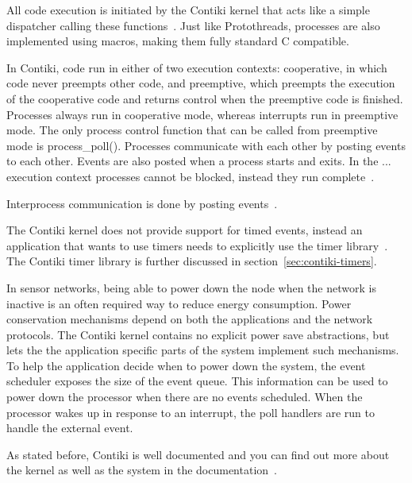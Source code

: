All code execution is initiated by the Contiki kernel
that acts like a simple dispatcher calling these functions~\cite{contiki-docs}.
Just like Protothreads, processes are also implemented using macros,
making them fully standard C compatible.

In Contiki, code run in either of two execution contexts:
cooperative, in which code never preempts other code, and preemptive,
which preempts the execution of the cooperative code and returns control
when the preemptive code is finished.
Processes always run in cooperative mode, whereas interrupts run in preemptive mode.
The only process control function that can be called from preemptive mode is process\_poll(). 
Processes communicate with each other by posting events to each other.
Events are also posted when a process starts and exits.
In the ... execution context processes cannot be blocked,
instead they run complete~\cite{video, paper-contiki}.

Interprocess communication is done by posting events~\cite{paper-contiki}.

The Contiki kernel does not provide support for timed events,
instead an application that wants to use timers needs to explicitly use the timer library~\cite{contiki-docs}.
The Contiki timer library is further discussed in section~\ref{sec:contiki-timers}.

In sensor networks, being able to power down the node
when the network is inactive is an often required way to reduce energy consumption.
Power conservation mechanisms
depend on both the applications and the network protocols.
The Contiki kernel contains no explicit power
save abstractions, but lets the the application specific parts
of the system implement such mechanisms.
To help the application decide when to power down the system, the event
scheduler exposes the size of the event queue.
This information can be used to power down the processor when there
are no events scheduled. When the processor wakes up in
response to an interrupt, the poll handlers are run to handle the external event.

As stated before, Contiki is well documented and you can find out more about
the kernel as well as the system in the documentation~\cite{contiki-docs}.
